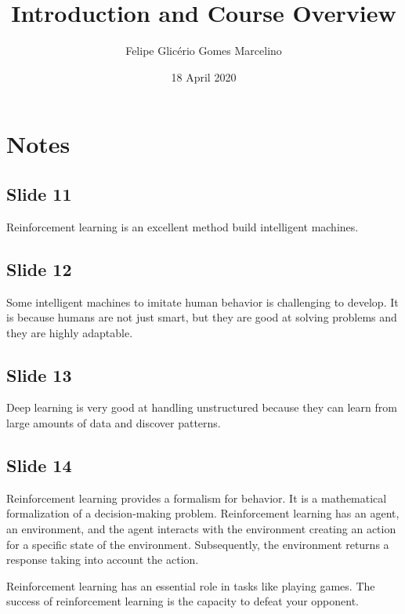 \documentclass{article}
\begin{document}
\title{Introduction and Course Overview}
\author{Felipe Glicério Gomes Marcelino}
\date{18 April 2020}
\maketitle

\section{Notes}

\subsection*{Slide 11}
\par Reinforcement learning is an excellent method  build intelligent machines.

\subsection*{Slide 12}
\par Some intelligent machines to imitate human behavior is challenging to develop. It is because humans are not just
smart, but they are good at solving problems and they are highly adaptable.

\subsection*{Slide 13}
\par Deep learning is very good at handling unstructured because they can learn from large amounts of data and
discover patterns.

\subsection*{Slide 14}

\par Reinforcement learning provides a formalism for behavior. It is a mathematical formalization of a decision-making problem. Reinforcement learning has an agent,
an environment, and the agent interacts with the environment creating an action for a specific state of the environment. Subsequently, the environment returns a response taking into account the action.

\par Reinforcement learning has an essential role in tasks like playing games. The success of reinforcement learning
is the capacity to defeat your opponent.
\end{document}
